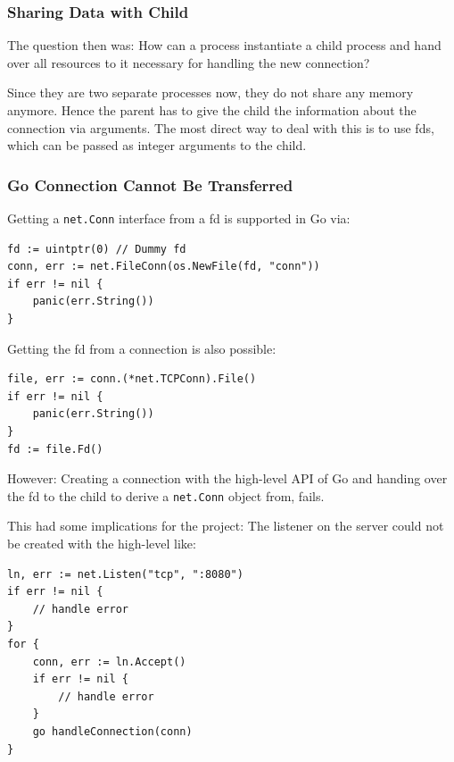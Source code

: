 \documentclass[10pt,a4paper,titlepage,twoside,english,final]{zhawreprt}
\begin{document}
\subsubsection{Sharing Data with Child}\label{sssec:SharingDataWithChild}
The question then was:
How can a process instantiate a child process and hand over all resources to it necessary for handling the new connection?

Since they are two separate processes now, they do not share any memory anymore.
Hence the parent has to give the child the information about the connection via arguments.
The most direct way to deal with this is to use \glspl{fd}, which can be passed as integer arguments to the child.

\subsubsection{Go Connection Cannot Be Transferred}\label{sssec:GoConnectionCannotBeTransferred}
Getting a \texttt{net.Conn} interface from a \gls{fd} is supported in \gls{Go} via:
\setlistingGo
\begin{lstlisting}[caption={Getting a \texttt{net.Conn} interface from a \gls{fd}},label=lst:ConnFromFD]
fd := uintptr(0) // Dummy fd
conn, err := net.FileConn(os.NewFile(fd, "conn"))
if err != nil {
	panic(err.String())
}
\end{lstlisting}

Getting the \gls{fd} from a connection is also possible:
\setlistingGo
\begin{lstlisting}[caption={Getting the \gls{fd} from a \texttt{net.Conn} object},label=lst:FDFromConn]
file, err := conn.(*net.TCPConn).File()
if err != nil {
	panic(err.String())
}
fd := file.Fd()
\end{lstlisting}

However: Creating a connection with the high-level \gls{API} of \gls{Go} and handing over the \gls{fd} to the child to derive a \texttt{net.Conn} object from, fails.

This had some implications for the project:
The listener on the server could not be created with the high-level like:
\setlistingGo
\begin{lstlisting}[caption={\gls{Go}'s high level \gls{API} for listener},label=lst:ListenForConn]
ln, err := net.Listen("tcp", ":8080")
if err != nil {
	// handle error
}
for {
	conn, err := ln.Accept()
	if err != nil {
		// handle error
	}
	go handleConnection(conn)
}
\end{lstlisting}
\end{document}

